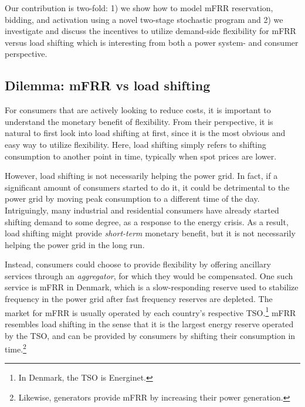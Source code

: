 Our contribution is two-fold: 1) we show how to model mFRR reservation, bidding, and activation using a novel two-stage stochastic program and 2) we investigate and discuss the incentives to utilize demand-side flexibility for mFRR versus load shifting which is interesting from both a power system- and consumer perspective. %

\IEEEpubidadjcol


\subsection{Dilemma: mFRR vs load shifting}

For consumers that are actively looking to reduce costs, it is important to understand the monetary benefit of flexibility. From their perspective, it is natural to first look into load shifting at first, since it is the most obvious and easy way to utilize flexibility. Here, load shifting simply refers to shifting consumption to another point in time, typically when spot prices are lower.

However, load shifting is not necessarily helping the power grid.
In fact, if a significant amount of consumers started to do it, it could be detrimental to the power grid by moving peak consumption to a different time of the day.
Intriguingly, many industrial and residential consumers have already started shifting demand to some degree, as a response to the energy crisis.
As a result, load shifting might provide \textit{short-term} monetary benefit, but it is not necessarily helping the power grid in the long run.

Instead, consumers could choose to provide flexibility by offering ancillary services through an \textit{aggregator}, for which they would be compensated.
One such service is mFRR in Denmark, which is a slow-responding reserve used to stabilize frequency in the power grid after fast frequency reserves are depleted. The market for mFRR is usually operated by each country's respective TSO.\footnote{In Denmark, the TSO is Energinet.} mFRR resembles load shifting in the sense that it is the largest energy reserve operated by the TSO, and can be provided by consumers by shifting their consumption in time.\footnote{Likewise, generators provide mFRR by increasing their power generation.}

